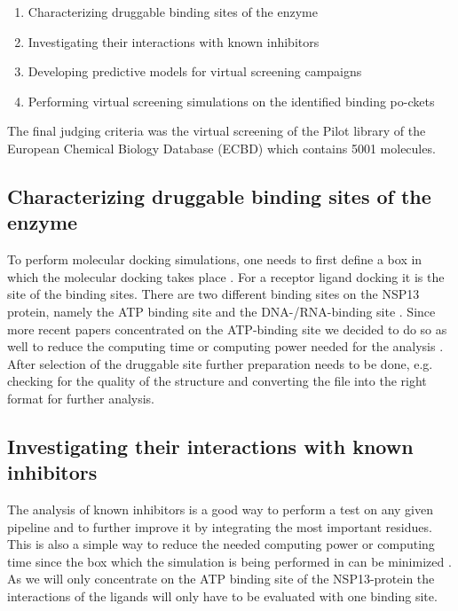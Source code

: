 \documentclass[11pt, letterpaper, titlepage]{article}
\begin{document}
\begin{enumerate} 

\item{Characterizing druggable binding sites of the enzyme} 

\item{Investigating their interactions with known inhibitors} 

\item{Developing predictive models for virtual screening campaigns} 

\item{Performing virtual screening simulations on the identified binding po-ckets} 

\end{enumerate} 
\vspace{1mm}
The final judging criteria was the virtual screening of the Pilot library of the European Chemical Biology Database (ECBD) which contains 5001 molecules. 

  

\subsection{Characterizing druggable binding sites of the enzyme} 

To perform molecular docking simulations, one needs to first define a box in which the molecular docking takes place \cite{Eberhardt2021}. For a receptor ligand docking it is the site of the binding sites. There are two different binding sites on the NSP13 protein, namely the ATP binding site and the DNA-/RNA-binding site \cite{White2020}.  
\newline
Since more recent papers concentrated on the ATP-binding site we decided to do so as well to reduce the computing time or computing power needed for the analysis \cite{White2020}.
\newline
After selection of the druggable site further preparation needs to be done, e.g. checking for the quality of the structure and converting the file into the right format for further analysis.

  

\subsection{Investigating their interactions with known inhibitors} 

The analysis of known inhibitors is a good way to perform a test on any given pipeline and to further improve it by integrating the most important residues. This is also a simple way to reduce the needed computing power or computing time since the box which the simulation is being performed in can be minimized \cite{Pushpakom2018}.  
\newline \newline
As we will only concentrate on the ATP binding site of the NSP13-protein the interactions of the ligands will only have to be evaluated with one binding site.  
\end{document}
